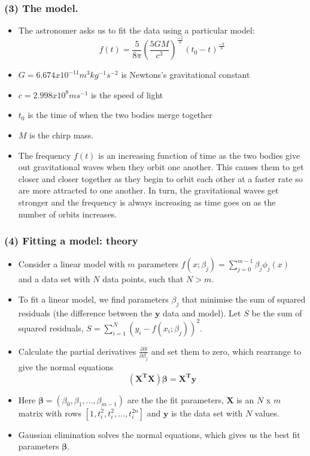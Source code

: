 \documentclass{beamer}
\renewcommand{\vec}[1]{\mathbf{#1}}
\begin{document}
\begin{frame}
\frametitle{(3) The model.}\begin{itemize} \item
The astronomer asks us to fit the data using a particular model: \begin{equation}f(t) = \frac{5}{8\pi}(\frac{5GM}{c^3})^{\frac{-5}{8}}(t_0 - t)^\frac{-3}{8}\end{equation}
 \item $G = 6.674 x10^{-11} m^3kg^{-1}s^{-2}$ is Newtons's gravitational constant \item $c= 2.998 x10^8 ms^{-1}$ is the speed of light \item $t_0$ is the time of when the two bodies merge together \item $M$ is the chirp mass. 
 \item The frequency $f(t)$ is an increasing function of time as the two bodies give out gravitational waves when they orbit one another. This causes them to get closer and closer together as they begin to orbit each other at a faster rate so are more attracted to one another. In turn, the gravitational waves get stronger and the frequency is always increasing as time goes on as the number of orbits increases.
\end{itemize} \end{frame}
\begin{frame}[fragile]
\frametitle{(4) Fitting a model: theory}
\begin{itemize} \item Consider a linear model with $m$ parameters $ f(x;\beta_j) = \sum_{j=0}^{m-1} \beta_j\phi_j(x)$ and a data set with $N$ data points, such that $N > m.$ 
\item To fit a linear model, we find parameters $\beta_j$ that minimise the sum of squared residuals (the difference between the $\textbf{y}$ data and model). Let $S$ be the sum of squared residuals, $ S = \sum_{i=1}^{N} (y_i - f(x_i;\beta_j))^2.$
\item Calculate the partial derivatives $\frac{\partial S}{\partial \beta_j}$ and set them to zero, which rearrange to give the normal equations $$\vec{(X^TX)}\boldsymbol\beta= \vec{X^Ty}$$
\item Here $\boldsymbol\beta = (\beta_0, \beta_1,...,\beta_{m-1})$ are the the fit parameters, $\vec{X}$ is an $N$ x $m$ matrix with rows $[1,t_i^2,t_i^2,...,t_i^{2n}]$ and $\vec{y}$ is the data set with $N$ values.
\item Gaussian elimination solves the normal equations, which gives us the best fit parameters $\boldsymbol\beta.$
\end{itemize}
\end{frame}
\end{document}
